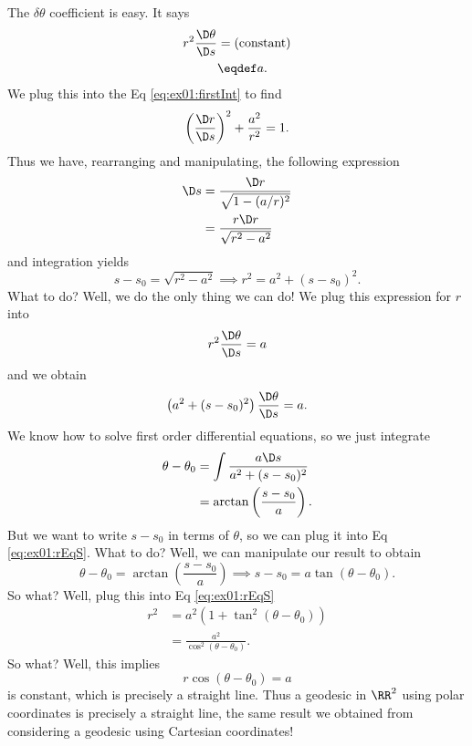 \begin{ex}[$\RR^2$ revisited]
The $\delta\theta$ coefficient is easy. It says
\begin{equation}
\begin{split}
r^{2}\frac{\D\theta}{\D s}&=\mbox{(constant)}\\
&\eqdef a.
\end{split}
\end{equation}
We plug this into the Eq \eqref{eq:ex01:firstInt} to find
\begin{equation}
\left(\frac{\D r}{\D s}\right)^{2}+\frac{a^{2}}{r^{2}}=1.
\end{equation}
Thus we have, rearranging and manipulating, the following
expression
\begin{equation}
\begin{split}
\D s&=
\frac{\D r}{\sqrt{1-(a/r)^{2}}}\\
&=\frac{r\D r}{\sqrt{r^{2}-a^{2}}}
\end{split}
\end{equation}
and integration yields
\begin{equation}\label{eq:ex01:rEqS}
s-s_{0}=\sqrt{r^{2}-a^{2}}\implies r^{2}=a^{2}+(s-s_{0})^{2}.
\end{equation}
What to do? Well, we do the only thing we can do! We plug this
expression for $r$ into
\begin{equation*}
r^{2}\frac{\D\theta}{\D s}=a
\end{equation*}
and we obtain
\begin{equation}
\left(a^{2}+(s-s_{0})^{2}\right)\frac{\D\theta}{\D s}=a.
\end{equation}
We know how to solve first order differential equations, so we
just integrate
\begin{equation}
\begin{split}
\theta-\theta_{0}&=\int\frac{a\D s}{a^{2}+(s-s_{0})^{2}}\\
&=\arctan\left(\frac{s-s_{0}}{a}\right).
\end{split}
\end{equation}
But we want to write $s-s_{0}$ in terms of $\theta$, so we can
plug it into Eq \eqref{eq:ex01:rEqS}. What to do? Well, we can
manipulate our result to obtain
\begin{equation}
\theta-\theta_{0}=\arctan\left(\frac{s-s_{0}}{a}\right)
\implies s-s_{0}=a\tan(\theta-\theta_{0}).
\end{equation}
So what? Well, plug this into Eq \eqref{eq:ex01:rEqS}
\begin{equation}
\begin{split}
r^{2}
&=a^{2}\left(1+\tan^{2}(\theta-\theta_{0})\right)\\
&=\frac{a^{2}}{\cos^{2}(\theta-\theta_{0})}.
\end{split}
\end{equation}
So what? Well, this implies
\begin{equation}
r\cos(\theta-\theta_{0})=a
\end{equation}
is constant, which is precisely a straight line. Thus a geodesic
in $\RR^2$ using polar coordinates is precisely a straight line,
the same result we obtained from considering a geodesic using
Cartesian coordinates!
\end{ex}
